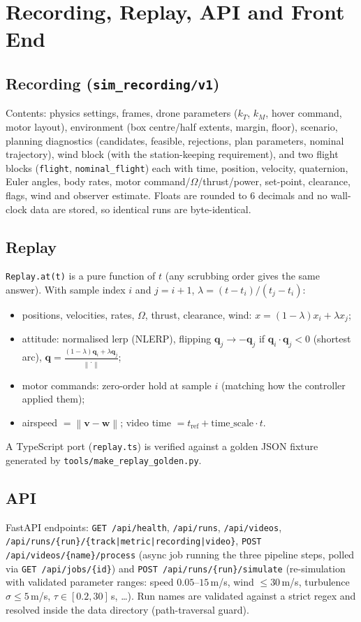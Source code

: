 \documentclass[11pt,a4paper]{article}
\newcommand{\vc}[1]{\bm{#1}}
\newcommand{\norm}[1]{\left\lVert #1\right\rVert}
\newcommand{\code}[1]{\texttt{\small #1}}
\begin{document}
\section{Recording, Replay, API and Front End}
\subsection{Recording (\code{sim\_recording/v1})}
Contents: physics settings, frames, drone parameters ($k_T$, $k_M$, hover command, motor layout), environment (box centre/half extents, margin, floor), scenario, planning diagnostics (candidates, feasible, rejections, plan parameters, nominal trajectory), wind block (with the station-keeping requirement), and two flight blocks
(\code{flight}, \code{nominal\_flight}) each with time, position, velocity, quaternion, Euler angles, body rates, motor command/$\Omega$/thrust/power, set-point, clearance, flags, wind and observer estimate.
Floats are rounded to $6$ decimals and no wall-clock data are stored, so identical runs are byte-identical.

\subsection{Replay}
\code{Replay.at(t)} is a pure function of $t$ (any scrubbing order gives the same answer). With sample index $i$ and $j=i+1$, $\lambda=(t-t_i)/(t_j-t_i)$:
\begin{itemize}
\item positions, velocities, rates, $\Omega$, thrust, clearance, wind: $x=(1-\lambda)x_i+\lambda x_j$;
\item attitude: normalised lerp (NLERP), flipping $\vc q_j\to-\vc q_j$ if $\vc q_i\!\cdot\!\vc q_j<0$ (shortest arc), $\vc q=\frac{(1-\lambda)\vc q_i+\lambda\vc q_j}{\norm{\cdot}}$;
\item motor commands: zero-order hold at sample $i$ (matching how the controller applied them);
\item airspeed $=\norm{\vc v-\vc w}$; video time $=t_{\text{ref}}+\text{time\_scale}\cdot t$.
\end{itemize}
A TypeScript port (\code{replay.ts}) is verified against a golden JSON fixture generated by \code{tools/make\_replay\_golden.py}.

\subsection{API}
FastAPI endpoints: \code{GET /api/health}, \code{/api/runs}, \code{/api/videos}, \code{/api/runs/\{run\}/\{track|metric|recording|video\}},
\code{POST /api/videos/\{name\}/process} (async job running the three pipeline steps, polled via \code{GET /api/jobs/\{id\}}) and
\code{POST /api/runs/\{run\}/simulate} (re-simulation with validated parameter ranges: speed $0.05$--$15$\,m/s, wind $\le30$\,m/s, turbulence $\sigma\le5$\,m/s, $\tau\in[0.2,30]$\,s, \dots).
Run names are validated against a strict regex and resolved inside the data directory (path-traversal guard).
\end{document}
